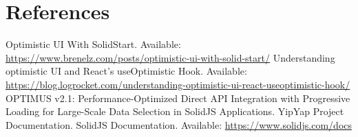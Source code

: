 \documentclass[10pt]{article}
\begin{document}
\section{References}
\begin{thebibliography}{99}
 Optimistic UI With SolidStart. Available: \url{https://www.brenelz.com/posts/optimistic-ui-with-solid-start/}
 Understanding optimistic UI and React’s useOptimistic Hook. Available: \url{https://blog.logrocket.com/understanding-optimistic-ui-react-useoptimistic-hook/}
 OPTIMUS v2.1: Performance-Optimized Direct API Integration with Progressive Loading for Large-Scale Data Selection in SolidJS Applications. YipYap Project Documentation.
 SolidJS Documentation. Available: \url{https://www.solidjs.com/docs}
\end{thebibliography}
\end{document}
